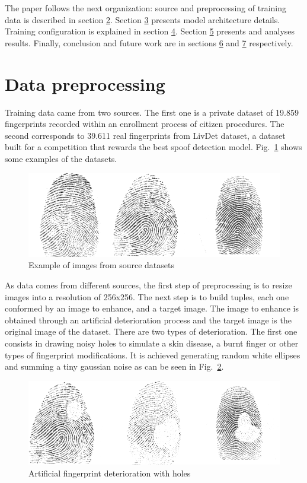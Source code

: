 \documentclass[a4paper,fleqn]{cas-dc}
\begin{document}
The paper follows the next organization: source and preprocessing of training data is described in section \hyperref[sec:DP]{2}. Section \hyperref[sec:MA]{3} presents model architecture details. Training configuration is explained in section \hyperref[sec:MT]{4}. Section \hyperref[sec:R]{5} presents and analyses results. Finally, conclusion and future work are in sections \hyperref[sec:FW]{6} and \hyperref[sec:FW]{7} respectively.
     
\section{Data preprocessing}
\label{sec:DP}

Training data came from two sources. The first one is a private dataset of 19.859 fingerprints recorded within an enrollment process of citizen procedures. The second corresponds to 39.611 real fingerprints from LivDet dataset, a dataset built for a competition that rewards the best spoof detection model. Fig.~\ref{fig1} shows some examples of the datasets. 

\begin{figure}[htbp]
\centerline{\includegraphics[scale=0.3]{figs/dataset_example.png}}
\caption{Example of images from source datasets}
\label{fig1}
\end{figure}

As data comes from different sources, the first step of preprocessing is to resize images into a resolution of 256x256. The next step is to build tuples, each one conformed by an image to enhance, and a target image. The image to enhance is obtained through an artificial deterioration process and the target image is the original image of the dataset. There are two types of deterioration. The first one consists in drawing noisy holes to simulate a skin disease, a burnt finger or other types of fingerprint modifications. It is achieved generating random white ellipses and summing a tiny gaussian noise as can be seen in Fig.~\ref{fig2}.

\begin{figure}[htbp]
\centerline{\includegraphics[scale=0.3]{figs/deterioration_1.png}}
\caption{Artificial fingerprint deterioration with holes}
\label{fig2}
\end{figure}
\end{document}

